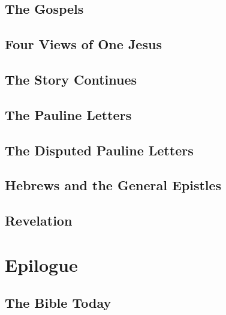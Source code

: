 \documentclass{report}
\begin{document}
    \chapter{The Gospels}
    \chapter{Four Views of One Jesus}
    \chapter{The Story Continues}
    \chapter{The Pauline Letters}
    \chapter{The Disputed Pauline Letters}
    \chapter{Hebrews and the General Epistles}
    \chapter{Revelation}

\part{Epilogue}

    \chapter{The Bible Today}
\end{document}
